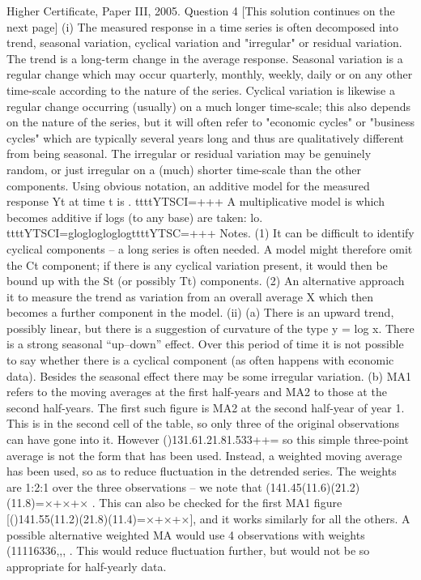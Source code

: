 Higher Certificate, Paper III, 2005. Question 4
[This solution continues on the next page]
(i) The measured response in a time series is often decomposed into trend, seasonal variation, cyclical variation and "irregular" or residual variation. The trend is a long-term change in the average response. Seasonal variation is a regular change which may occur quarterly, monthly, weekly, daily or on any other time-scale according to the nature of the series. Cyclical variation is likewise a regular change occurring (usually) on a much longer time-scale; this also depends on the nature of the series, but it will often refer to "economic cycles" or "business cycles" which are typically several years long and thus are qualitatively different from being seasonal. The irregular or residual variation may be genuinely random, or just irregular on a (much) shorter time-scale than the other components.
Using obvious notation, an additive model for the measured response Yt at time t is
. ttttYTSCI=+++
A multiplicative model is which becomes additive if logs (to any base) are taken: lo. ttttYTSCI=gloglogloglogttttYTSC=+++
Notes.
(1) It can be difficult to identify cyclical components – a long series is often needed. A model might therefore omit the Ct component; if there is any cyclical variation present, it would then be bound up with the St (or possibly Tt) components.
(2) An alternative approach it to measure the trend as variation from an overall average X which then becomes a further component in the model.
(ii) (a) There is an upward trend, possibly linear, but there is a suggestion of curvature of the type y = log x. There is a strong seasonal “up–down” effect. Over this period of time it is not possible to say whether there is a cyclical component (as often happens with economic data). Besides the seasonal effect there may be some irregular variation.
(b) MA1 refers to the moving averages at the first half-years and MA2 to those at the second half-years. The first such figure is MA2 at the second half-year of year 1. This is in the second cell of the table, so only three of the original observations can have gone into it. However ()131.61.21.81.533++= so this simple three-point average is not the form that has been used. Instead, a weighted moving average has been used, so as to reduce fluctuation in the detrended series. The weights are 1:2:1 over the three observations – we note that (141.45(11.6)(21.2)(11.8)=×+×+× . This can also be checked for
the first MA1 figure [()141.55(11.2)(21.8)(11.4)=×+×+×], and it works similarly for all the others.
A possible alternative weighted MA would use 4 observations with weights (11116336,,, . This would reduce fluctuation further, but would not be so appropriate for half-yearly data.
